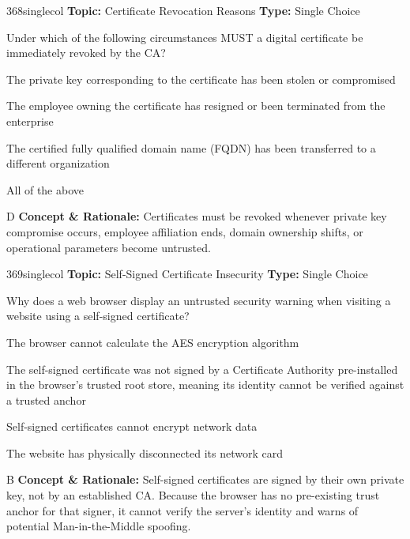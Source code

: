 \begin{qcard}{368}{singlecol}
\textcolor{darkslate!75}{\small\textbf{Topic:} Certificate Revocation Reasons \hfill \textbf{Type:} Single Choice}\vspace{0.4em}\par
Under which of the following circumstances MUST a digital certificate be immediately revoked by the CA?
\begin{qoptions}
\item The private key corresponding to the certificate has been stolen or compromised
\item The employee owning the certificate has resigned or been terminated from the enterprise
\item The certified fully qualified domain name (FQDN) has been transferred to a different organization
\item All of the above
\end{qoptions}
\end{qcard}
\nopagebreak
\begin{explainbox}{D}
\textbf{Concept \& Rationale:} Certificates must be revoked whenever private key compromise occurs, employee affiliation ends, domain ownership shifts, or operational parameters become untrusted.
\end{explainbox}

\begin{qcard}{369}{singlecol}
\textcolor{darkslate!75}{\small\textbf{Topic:} Self-Signed Certificate Insecurity \hfill \textbf{Type:} Single Choice}\vspace{0.4em}\par
Why does a web browser display an untrusted security warning when visiting a website using a self-signed certificate?
\begin{qoptions}
\item The browser cannot calculate the AES encryption algorithm
\item The self-signed certificate was not signed by a Certificate Authority pre-installed in the browser's trusted root store, meaning its identity cannot be verified against a trusted anchor
\item Self-signed certificates cannot encrypt network data
\item The website has physically disconnected its network card
\end{qoptions}
\end{qcard}
\nopagebreak
\begin{explainbox}{B}
\textbf{Concept \& Rationale:} Self-signed certificates are signed by their own private key, not by an established CA. Because the browser has no pre-existing trust anchor for that signer, it cannot verify the server's identity and warns of potential Man-in-the-Middle spoofing.
\end{explainbox}

